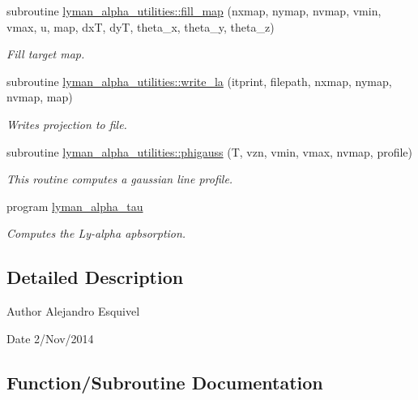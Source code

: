 \begin{DoxyCompactItemize}
subroutine \hyperlink{namespacelyman__alpha__utilities_a7ca5810d29123f1c5c6fd3170f5f5bf3}{lyman\+\_\+alpha\+\_\+utilities\+::fill\+\_\+map} (nxmap, nymap, nvmap, vmin, vmax, u, map, dx\+T, dy\+T, theta\+\_\+x, theta\+\_\+y, theta\+\_\+z)
\begin{DoxyCompactList}\small\item\em Fill target map. \end{DoxyCompactList}\item 
subroutine \hyperlink{namespacelyman__alpha__utilities_afdab7ea06bb95956c43102154651cfd1}{lyman\+\_\+alpha\+\_\+utilities\+::write\+\_\+la} (itprint, filepath, nxmap, nymap, nvmap, map)
\begin{DoxyCompactList}\small\item\em Writes projection to file. \end{DoxyCompactList}\item 
subroutine \hyperlink{namespacelyman__alpha__utilities_a826e6fe44f66513e5a47f2b968e1d0b8}{lyman\+\_\+alpha\+\_\+utilities\+::phigauss} (T, vzn, vmin, vmax, nvmap, profile)
\begin{DoxyCompactList}\small\item\em This routine computes a gaussian line profile. \end{DoxyCompactList}\item 
program \hyperlink{lyman__alpha__tau_8f90_ac17b5fa88f45d76c5707da8a09262fe7}{lyman\+\_\+alpha\+\_\+tau}
\begin{DoxyCompactList}\small\item\em Computes the Ly-\/alpha apbsorption. \end{DoxyCompactList}\end{DoxyCompactItemize}


\subsection{Detailed Description}
\begin{DoxyAuthor}{Author}
Alejandro Esquivel 
\end{DoxyAuthor}
\begin{DoxyDate}{Date}
2/\+Nov/2014 
\end{DoxyDate}


\subsection{Function/\+Subroutine Documentation}
\hypertarget{lyman__alpha__tau_8f90_ac17b5fa88f45d76c5707da8a09262fe7}{}
